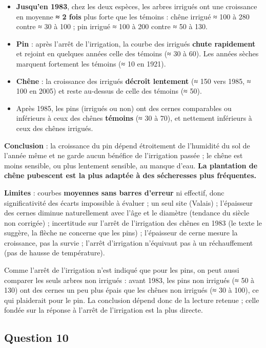 \documentclass[11pt,a4paper]{article}
\providecommand{\tightlist}{\setlength{\itemsep}{0pt}\setlength{\parskip}{0pt}}
\begin{document}
\begin{itemize}
\tightlist
\item
  \textbf{Jusqu'en 1983}, chez les deux espèces, les arbres irrigués ont une croissance en moyenne \textbf{≈ 2 fois} plus forte que les témoins : chêne irrigué ≈ 100 à 280 contre ≈ 30 à 100 ; pin irrigué ≈ 100 à 200 contre ≈ 50 à 130.
\item
  \textbf{Pin} : après l'arrêt de l'irrigation, la courbe des irrigués \textbf{chute rapidement} et rejoint en quelques années celle des témoins (≈ 30 à 60). Les années sèches marquent fortement les témoins (≈ 10 en 1921).
\item
  \textbf{Chêne} : la croissance des irrigués \textbf{décroît lentement} (≈ 150 vers 1985, ≈ 100 en 2005) et reste au-dessus de celle des témoins (≈ 50).
\item
  Après 1985, les pins (irrigués ou non) ont des cernes comparables ou inférieurs à ceux des chênes \textbf{témoins} (≈ 30 à 70), et nettement inférieurs à ceux des chênes irrigués.
\end{itemize}

\textbf{Conclusion} : la croissance du pin dépend étroitement de l'humidité du sol de l'année même et ne garde aucun bénéfice de l'irrigation passée ; le chêne est moins sensible, ou plus lentement sensible, au manque d'eau. \textbf{La plantation de chêne pubescent est la plus adaptée à des sécheresses plus fréquentes.}

\textbf{Limites} : courbes \textbf{moyennes sans barres d'erreur} ni effectif, donc significativité des écarts impossible à évaluer ; un seul site (Valais) ; l'épaisseur des cernes diminue naturellement avec l'âge et le diamètre (tendance du siècle non corrigée) ; incertitude sur l'arrêt de l'irrigation des chênes en 1983 (le texte le suggère, la flèche ne concerne que les pins) ; l'épaisseur de cerne mesure la croissance, pas la survie ; l'arrêt d'irrigation n'équivaut pas à un réchauffement (pas de hausse de température).

Comme l'arrêt de l'irrigation n'est indiqué que pour les pins, on peut aussi comparer les seuls arbres non irrigués : avant 1983, les pins non irrigués (≈ 50 à 130) ont des cernes un peu plus épais que les chênes non irrigués (≈ 30 à 100), ce qui plaiderait pour le pin. La conclusion dépend donc de la lecture retenue ; celle fondée sur la réponse à l'arrêt de l'irrigation est la plus directe.

\hypertarget{question-10}{%
\subsection{Question 10}\label{question-10}}
\end{document}
